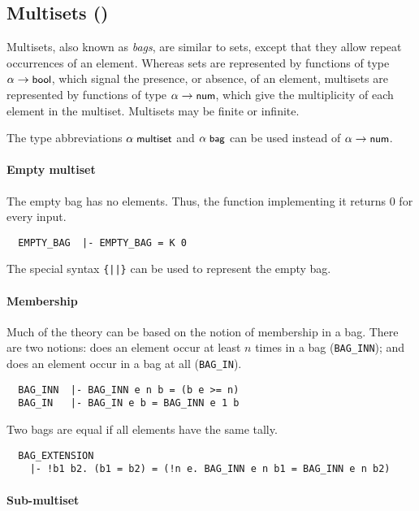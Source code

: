 \subsection{Multisets ()}\label{multiset}

Multisets, also known as \emph{bags}, are similar to sets, except that
they allow repeat occurrences of an element. Whereas sets are
represented by functions of type $\alpha\to\mbox{\small{\textbf{\sf{bool}}}}$, which signal
the presence, or absence, of an element, multisets are represented
by functions of type $\alpha\to\mbox{\small{\textbf{\sf{num}}}}$, which give the
multiplicity of each element in the multiset. Multisets may be finite
or infinite.

The type abbreviations $\alpha\;\mbox{\small{\textbf{\sf{multiset}}}}$ and
$\alpha\;\mbox{\small{\textbf{\sf{bag}}}}$ can be used instead of $\alpha\to\mbox{\small{\textbf{\sf{num}}}}$.

\paragraph {Empty multiset}

The empty bag has no elements. Thus, the function implementing it
returns $0$ for every input.
%
{\small
\begin{verbatim}
  EMPTY_BAG  |- EMPTY_BAG = K 0
\end{verbatim}
}

\noindent The special syntax {\verb+{||}+} can be used to represent the empty
bag.

\paragraph {Membership}

Much of the theory can be based on the notion of membership in a
bag. There are two notions: does an element occur at least $n$ times
in a bag ({\small\verb+BAG_INN+}); and does an element occur in a bag
at all ({\small\verb+BAG_IN+}).
%
{\small
\begin{verbatim}
  BAG_INN  |- BAG_INN e n b = (b e >= n)
  BAG_IN   |- BAG_IN e b = BAG_INN e 1 b
\end{verbatim}
}
%
\noindent Two bags are equal if all elements have the same tally.
%
{\small
\begin{verbatim}
  BAG_EXTENSION
    |- !b1 b2. (b1 = b2) = (!n e. BAG_INN e n b1 = BAG_INN e n b2)
\end{verbatim}
}

\paragraph{Sub-multiset}

